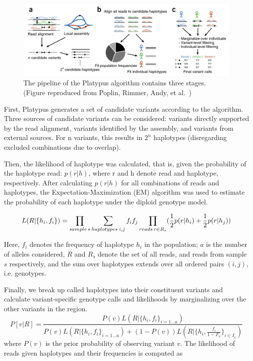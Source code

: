 \documentclass[PhD]{PHlab-thesis}
\begin{document}
\begin{figure}[h!]
	\centering
	\includegraphics[scale=0.4]{figures/Platypus.png}
	\caption{The pipeline of the Platypus algorithm contains three stages. (Figure reproduced from Poplin, Rimmer, Andy, et al.~\cite{Poplin2018GH})}
	\label{fig:Platypus} %
\end{figure}

First, Platypus generates a set of candidate variants according to the algorithm. Three sources of candidate variants can be considered: variants directly supported by the read alignment, variants identified by the assembly, and variants from external sources. For n variants, this results in $2^{n}$ haplotypes (disregarding excluded combinations due to overlap).

Then, the likelihood of haplotype was calculated, that is, given the probability of the haplotype read: $p(r|h)$, where r and h denote read and haplotype, respectively. After calculating $p(r|h)$ for all combinations of reads and haplotypes, the Expectation-Maximization (EM) algorithm was used to estimate the probability of each haplotype under the diploid genotype model.

\begin{equation}
  L(R|\{ {h_i,f_i} \}) = \prod_{sample \hspace{0.5mm} s}\sum_{haplotypes \hspace{0.75mm} i,j} {f_if_j} \prod_{reads \hspace{0.5mm} r \in R_s} (\frac{1}{2}p(r|h_i) + \frac{1}{2} p(r|h_j))
\end{equation}

Here, $f_i$ denotes the frequency of \hspace{0.05mm} haplotype $h_i$ in the population; $a$ is the number of alleles considered, $R$ and $R_s$ denote the set of all reads, and reads from sample $s$ respectively, and the sum over haplotypes extends over all ordered pairs $(i,j)$, i.e. genotypes.

Finally, we break up called haplotypes into their constituent variants and calculate variant-specific genotype calls and likelihoods by marginalizing over the other variants in the region.
\begin{equation}
  P[v|R] = \frac{P(v)L(R| \{ {h_i,f_i} \} _{i=1...a})}        {P(v)L(R| \{ {h_i,f_i} \}_{i=1...a})+(1-P(v))L(R|\{ {h_i,\frac{f_i}{1-F_v} \} _{i\in I_v}})}
\end{equation}
where $P(v)$ is the prior probability of observing variant $v$. The likelihood of reads given haplotypes and their frequencies is computed as
\end{document}
